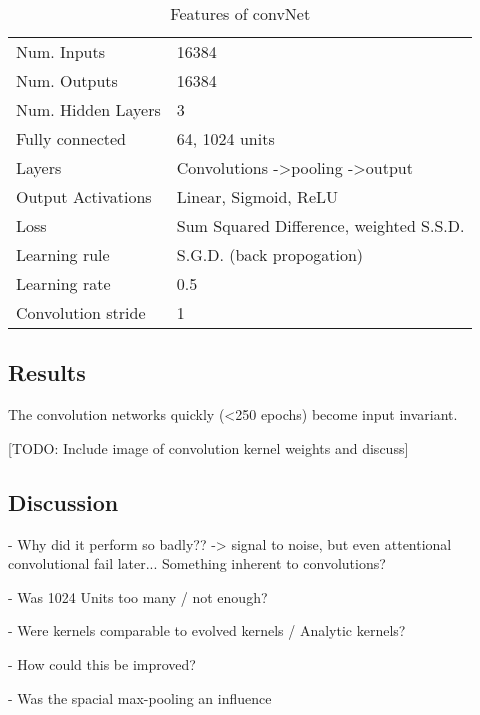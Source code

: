 \begin{table}[h]
\centering
\begin{tabular}{ | l | l | }
    \hline
    Num. Inputs & 16384 \\
    Num. Outputs & 16384 \\
    Num. Hidden Layers & 3 \\
    Fully connected & 64, 1024 units \\
    Layers & Convolutions -\textgreater pooling -\textgreater output \\
    Output Activations & Linear, Sigmoid, ReLU \\
    Loss & Sum Squared Difference, weighted S.S.D. \\
    Learning rule & S.G.D. (back propogation) \\
    Learning rate & 0.5 \\
    Convolution stride & 1 \\
    \hline
\end{tabular}
\caption{Features of convNet}
\label{tb:convNetdef}
\end{table}


\subsection{Results}
The convolution networks quickly (\textless 250 epochs) become input invariant.

[TODO: Include image of convolution kernel weights and discuss] 



\subsection{Discussion}
 - Why did it perform so badly?? -> signal to noise, but even attentional convolutional fail later... Something inherent to convolutions?

 - Was 1024 Units too many / not enough?

 - Were kernels comparable to evolved kernels / Analytic kernels?

 - How could this be improved?

 - Was the spacial max-pooling an influence

